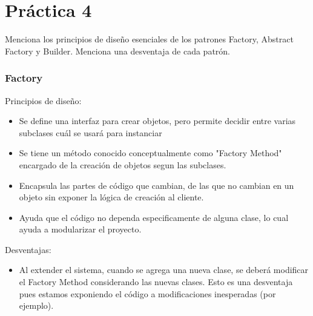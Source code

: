 \documentclass{article}
\begin{document}

\section*{\LARGE{Práctica 4}}

Menciona los principios de diseño esenciales de los patrones Factory, Abstract Factory y Builder.
Menciona una desventaja de cada patrón.

\subsubsection*{Factory}
Principios de diseño:
\newcommand{\localtextbulletone}{\textcolor{black}{\raisebox{.45ex}{\rule{.6ex}{.6ex}}}}
\renewcommand{\labelitemi}{\localtextbulletone}
\begin{itemize}
\item Se define una interfaz para crear objetos, pero permite decidir entre varias subclases cuál se usará para instanciar
\item Se tiene un método conocido conceptualmente como "Factory Method" encargado de la creación de objetos segun las subclases.
\item Encapsula las partes de código que cambian, de las que no cambian en un objeto sin exponer la lógica de creación al cliente.
\item Ayuda que el código no dependa especificamente de alguna clase, lo cual ayuda a modularizar el proyecto.

\end{itemize}
Desventajas:
\begin{itemize}

\item Al extender el sistema, cuando se agrega una nueva clase, se deberá modificar el Factory Method considerando las nuevas clases. 
Esto es una desventaja pues estamos exponiendo el código a modificaciones inesperadas (por ejemplo).
\end{itemize}
\end{document}
